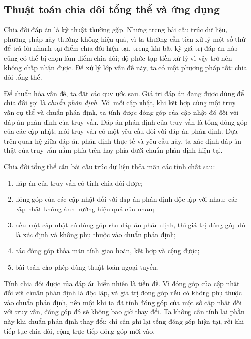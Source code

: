 \documentclass[11pt]{article}
\begin{document}
\subsection{Thuật toán chia đôi tổng thể và ứng dụng}

Chia đôi đáp án là kỹ thuật thường gặp. Nhưng trong bài cấu trúc dữ liệu,
phương pháp này thường không hiệu quả, vì ta thường cần tiền xử lý một số
thứ để trả lời nhanh tại điểm chia đôi hiện tại, trong khi bất kỳ giá trị đáp
án nào cũng có thể bị chọn làm điểm chia đôi; độ phức tạp tiền xử lý vì vậy
trở nên không chấp nhận được. Để xử lý lớp vấn đề này, ta có một phương pháp
tốt: chia đôi tổng thể.

Để chuẩn hóa vấn đề, ta đặt các quy ước sau. Giá trị đáp án đang được dùng
để chia đôi gọi là \emph{chuẩn phán định}. Với mỗi cập nhật, khi kết hợp
cùng một truy vấn cụ thể và chuẩn phán định, ta tính được đóng góp của cập
nhật đó đối với đáp án phán định của truy vấn. Đáp án phán định của truy vấn
là tổng đóng góp của các cập nhật; mỗi truy vấn có một yêu cầu đối với đáp
án phán định. Dựa trên quan hệ giữa đáp án phán định thực tế và yêu cầu này,
ta xác định đáp án thật của truy vấn nằm phía trên hay phía dưới chuẩn phán
định hiện tại.

Chia đôi tổng thể cần bài cấu trúc dữ liệu thỏa mãn các tính chất sau:
\begin{enumerate}
  \item đáp án của truy vấn có tính chia đôi được;
  \item đóng góp của các cập nhật đối với đáp án phán định độc lập với nhau;
  các cập nhật không ảnh hưởng hiệu quả của nhau;
  \item nếu một cập nhật có đóng góp cho đáp án phán định, thì giá trị đóng
  góp đó là xác định và không phụ thuộc vào chuẩn phán định;
  \item các đóng góp thỏa mãn tính giao hoán, kết hợp và cộng được;
  \item bài toán cho phép dùng thuật toán ngoại tuyến.
\end{enumerate}

Tính chia đôi được của đáp án hiển nhiên là tiền đề. Vì đóng góp của cập
nhật đối với chuẩn phán định là độc lập, và giá trị đóng góp nếu có không
phụ thuộc vào chuẩn phán định, nên một khi ta đã tính đóng góp của một số
cập nhật đối với truy vấn, đóng góp đó sẽ không bao giờ thay đổi. Ta không
cần tính lại phần này khi chuẩn phán định thay đổi; chỉ cần ghi lại tổng
đóng góp hiện tại, rồi khi tiếp tục chia đôi, cộng trực tiếp đóng góp mới
vào.
\end{document}
